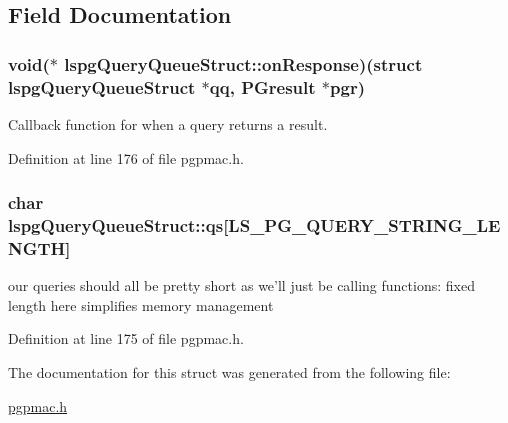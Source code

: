 \subsection{Field Documentation}
\hypertarget{structlspgQueryQueueStruct_a53bac5ae4cab775423940bff5092a831}{
\subsubsection[{on\-Response}]{\setlength{\rightskip}{0pt plus 5cm}void($\ast$ lspg\-Query\-Queue\-Struct\-::on\-Response)(struct {\bf lspg\-Query\-Queue\-Struct} $\ast$qq, P\-Gresult $\ast$pgr)}}\label{structlspgQueryQueueStruct_a53bac5ae4cab775423940bff5092a831}


Callback function for when a query returns a result. 



Definition at line 176 of file pgpmac.\-h.

\hypertarget{structlspgQueryQueueStruct_abf8c9c581b38a5e3e269eda69e47de15}{
\subsubsection[{qs}]{\setlength{\rightskip}{0pt plus 5cm}char lspg\-Query\-Queue\-Struct\-::qs\mbox{[}{\bf L\-S\-\_\-\-P\-G\-\_\-\-Q\-U\-E\-R\-Y\-\_\-\-S\-T\-R\-I\-N\-G\-\_\-\-L\-E\-N\-G\-T\-H}\mbox{]}}}\label{structlspgQueryQueueStruct_abf8c9c581b38a5e3e269eda69e47de15}


our queries should all be pretty short as we'll just be calling functions\-: fixed length here simplifies memory management 



Definition at line 175 of file pgpmac.\-h.



The documentation for this struct was generated from the following file\-:\begin{DoxyCompactItemize}
\item 
\hyperlink{pgpmac_8h}{pgpmac.\-h}\end{DoxyCompactItemize}
